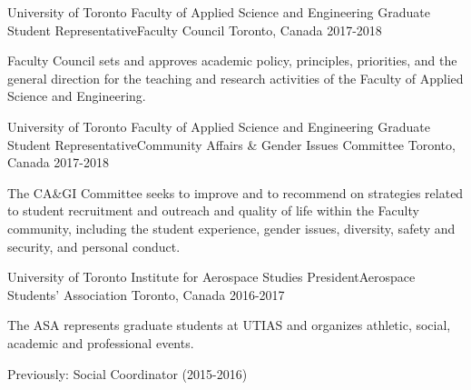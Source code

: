 

\begin{cventries}

  \cventry
    {University of Toronto Faculty of Applied Science and Engineering} %
    {Graduate Student Representative{\enskip\cdotp\enskip}Faculty Council} %
    {Toronto, Canada} %
    {2017-2018} %
    {
      \begin{cvitems} %
        \item {Faculty Council sets and approves academic policy, principles, priorities, and the general direction for the teaching and research activities of the Faculty of Applied Science and Engineering.}
      \end{cvitems}
    }

  \cventry
    {University of Toronto Faculty of Applied Science and Engineering} %
    {Graduate Student Representative{\enskip\cdotp\enskip}Community Affairs \& Gender Issues Committee} %
    {Toronto, Canada} %
    {2017-2018} %
    {
      \begin{cvitems} %
        \item {The CA\&GI Committee seeks to improve and to recommend on strategies related to student recruitment and outreach and quality of life within the Faculty community, including the student experience, gender issues, diversity, safety and security, and personal conduct.}
      \end{cvitems}
    }

  \cventry
    {University of Toronto Institute for Aerospace Studies} %
    {President{\enskip\cdotp\enskip}Aerospace Students' Association} %
    {Toronto, Canada} %
    {2016-2017} %
    {
      \begin{cvitems} %
        \item {The ASA represents graduate students at UTIAS and organizes athletic, social, academic and professional events.}
        \item{Previously: Social Coordinator (2015-2016)}
      \end{cvitems}
    }
  

\end{cventries}
